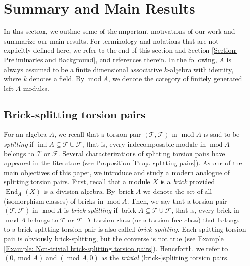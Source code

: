 \documentclass{amsart}
\theoremstyle{thmstyle}
\theoremstyle{exstyle}
\theoremstyle{defstyle}
\theoremstyle{remstyle}
\theoremstyle{remstyle}
\DeclareMathOperator{\End}{End}
\DeclareMathOperator*{\modu}{mod}
\DeclareMathOperator*{\ind}{ind}
\DeclareMathOperator*{\brick}{brick}
\begin{document}
\maketitle

\tableofcontents

\newpage

\section{Summary and Main Results}\label{Sec: Summary of Main Results}

In this section, we outline some of the important motivations of our work and summarize our main results. For terminology and notations that are not explicitly defined here, we refer to the end of this section and Section \ref{Section: Preliminaries and Background}, and references therein. 
In the following, $A$ is always assumed to be a finite dimensional associative $k$-algebra with identity, where $k$ denotes a field. By $\modu A$, we denote the category of finitely generated left $A$-modules.

\subsection{Brick-splitting torsion pairs}\label{Subsection: Brick-splitting torsion pairs}
For an algebra $A$, we recall that a torsion pair $(\mathcal{T},\mathcal{F})$ in $\modu A$ is said to be \emph{splitting} if $\ind A \subseteq \mathcal{T}\cup \mathcal{F}$, that is, every indecomposable module in $\modu A$ belongs to $\mathcal{T}$ or $\mathcal{F}$. Several characterizations of splitting torsion pairs have appeared in the literature (see Proposition \ref{Prop: splitting pairs}). 
As one of the main objectives of this paper, we introduce and study a modern analogue of splitting torsion pairs. First, recall that a module $X$ is a \emph{brick} provided $\End_A(X)$ is a division algebra. By $\brick A$ we denote the set of all (isomorphism classes) of bricks in $\modu A$. 
Then, we say that a torsion pair $(\mathcal{T},\mathcal{F})$ in $\modu A$ is \emph{brick-splitting} if $\brick A\subseteq \mathcal{T}\cup \mathcal{F}$, that is, every brick in $\modu A$ belongs to $\mathcal{T}$ or $\mathcal{F}$. A torsion class (or a torsion-free class) that belongs to a brick-splitting torsion pair is also called \emph{brick-splitting}. 
Each splitting torsion pair is obviously brick-splitting, but the converse is not true (see Example \ref{Example: Non-trivial brick-splitting torsion pairs}).  Henceforth, we refer to $(0,\modu A)$ and $(\modu A,0)$ as the \emph{trivial} (brick-)splitting torsion pairs.
\end{document}

